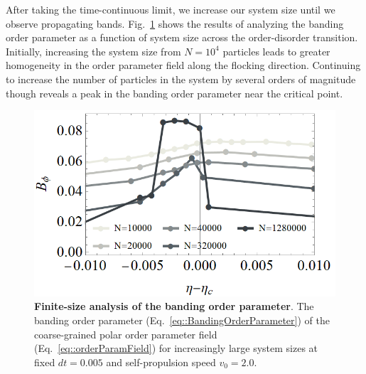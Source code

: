 \documentclass[twoside,twocolumn,9pt]{article}
\begin{document}
After taking the time-continuous limit, we increase our system size until we observe propagating bands. Fig.~\ref{fig:bandingFSS} shows the results of analyzing the banding order parameter as a function of system size across the order-disorder transition. Initially, increasing the system size from $N=10^4$ particles leads to greater homogeneity in the order parameter field along the flocking direction. Continuing to increase the number of particles in the system by several orders of magnitude though reveals a peak in the banding order parameter near the critical point.

\begin{figure}[h]
	\centering
	\includegraphics[width=0.99\columnwidth]{Figures/bandingFSS.PNG}
    \caption{\textbf{Finite-size analysis of the banding order parameter}. The banding order parameter (Eq.~\ref{eq::BandingOrderParameter}) of the coarse-grained polar order parameter field (Eq.~\ref{eq::orderParamField}) for increasingly large system sizes at fixed $dt=0.005$ and self-propulsion speed $v_0=2.0$.
	}
	\label{fig:bandingFSS}
\end{figure}
\end{document}
